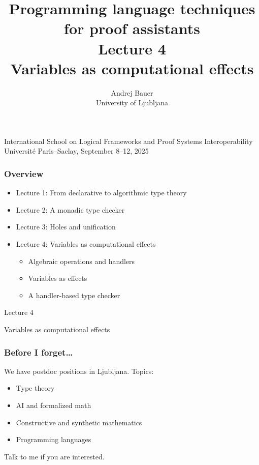 \documentclass[11pt,aspectratio=169,fleqn]{beamer}
\title{Programming language techniques \\for proof assistants\\[2ex]Lecture 4\\Variables as computational effects}
\author{Andrej Bauer\\University of Ljubljana}
\date{}
\begin{document}
\begin{frame}
\hbox{}\vfil

\titlepage

\vfil

\begin{center}
\footnotesize
International School on Logical Frameworks and Proof Systems Interoperability \\
Université Paris--Saclay, September 8--12, 2025
\end{center}

\end{frame}

\begin{frame}
  \frametitle{Overview}

  \begin{itemize}
  \item \textcolor{grayoutColor}{Lecture 1: From declarative to algorithmic type theory}
  \item \textcolor{grayoutColor}{Lecture 2: A monadic type checker}
  \item \textcolor{grayoutColor}{Lecture 3: Holes and unification}
  \item
    Lecture 4: Variables as computational effects
    \begin{itemize}
    \item Algebraic operations and handlers
    \item Variables as effects
    \item A handler-based type checker
    \end{itemize}
  \end{itemize}


\end{frame}

\begin{frame}
  \begin{center}
    \Huge Lecture 4

    \bigskip

    \Large
    Variables as computational effects
  \end{center}
\end{frame}


\begin{frame}
  \frametitle{Before I forget\dots}

  We have postdoc positions in Ljubljana. Topics:
  \begin{itemize}
  \item Type theory
  \item AI and formalized math
  \item Constructive and synthetic mathematics
  \item Programming languages
  \end{itemize}
  Talk to me if you are interested.
\end{frame}
\end{document}
